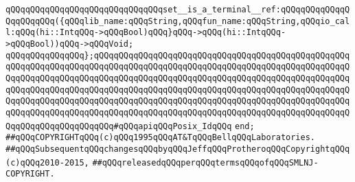 \verb|qQQqqQQqqQQqqQQqqQQqqQQqqQQqqQQqset__is_a_terminal__ref:qQQqqQQqqQQqqQQqqQQqqQQq({qQQqlib_name:qQQqString,qQQqfun_name:qQQqString,qQQqio_call:qQQq(hi::IntqQQq->qQQqBool)qQQq}qQQq->qQQq(hi::IntqQQq->qQQqBool))qQQq->qQQqVoid;|\newline
\verb|qQQqqQQqqQQqqQQq};qQQqqQQqqQQqqQQqqQQqqQQqqQQqqQQqqQQqqQQqqQQqqQQqqQQqqQQqqQQqqQQqqQQqqQQqqQQqqQQqqQQqqQQqqQQqqQQqqQQqqQQqqQQqqQQqqQQqqQQqqQQqqQQqqQQqqQQqqQQqqQQqqQQqqQQqqQQqqQQqqQQqqQQqqQQqqQQqqQQqqQQqqQQqqQQqqQQqqQQqqQQqqQQqqQQqqQQqqQQqqQQqqQQqqQQqqQQqqQQqqQQqqQQqqQQqqQQqqQQqqQQqqQQqqQQqqQQqqQQqqQQqqQQqqQQqqQQqqQQqqQQqqQQqqQQqqQQqqQQqqQQqqQQqqQQqqQQqqQQqqQQqqQQqqQQqqQQqqQQqqQQqqQQqqQQqqQQqqQQqqQQqqQQqqQQqqQQqqQQqqQQqqQQqqQQqqQQqqQQqqQQq#qQQqapiqQQqPosix_IdqQQq|\newline
\verb|end;|\newline
\newline
\newline
\verb|##qQQqCOPYRIGHTqQQq(c)qQQq1995qQQqAT&TqQQqBellqQQqLaboratories.|\newline
\verb|##qQQqSubsequentqQQqchangesqQQqbyqQQqJeffqQQqProtheroqQQqCopyrightqQQq(c)qQQq2010-2015,|\newline
\verb|##qQQqreleasedqQQqperqQQqtermsqQQqofqQQqSMLNJ-COPYRIGHT.|\newline


